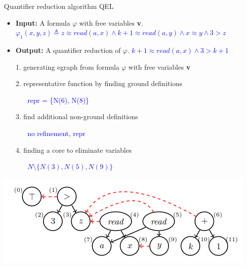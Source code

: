 \documentclass{beamer}
\begin{document}
\begin{frame}{Quantifier reduction algorithm QEL}

\begin{center}
\begin{itemize}
    \item \textbf{Input:} A formula $\varphi$ with free variables \textbf{v}. 
    \textcolor{blue}{$\varphi_1 (x,y,z) \triangleq z \approx read(a,x) \land k + 1 \approx read(a,y) \land x \approx y \land 3 > z$}
    \item \textbf{Output:} A quantifier reduction of $\varphi$.
    \textcolor{blue}{$k+1 \approx read(a,x) \land 3 > k+1$}
    \item[1.] generating egraph from formula $\varphi$ with free variables
    \textbf{v}
    \item[2.] representative function by finding ground definitions
    \begin{itemize}
        \item[] \textcolor{blue}{repr = \{N(6), N(8)\}}
    \end{itemize}
    \item[3.] find additional non-ground definitions
    \begin{itemize}
        \item[] \textcolor{blue}{no refinement, repr}
    \end{itemize}
    \item[4.] finding a core to eliminate variables
    \begin{itemize}
        \item[] \textcolor{blue}{$N \setminus \{N(3), N(5), N(9) \}$}
    \end{itemize}
\end{itemize}
\end{center}
\begin{center}
\includegraphics[scale=0.4]{FMI1.png}
\end{center}

\end{frame}
\end{document}
